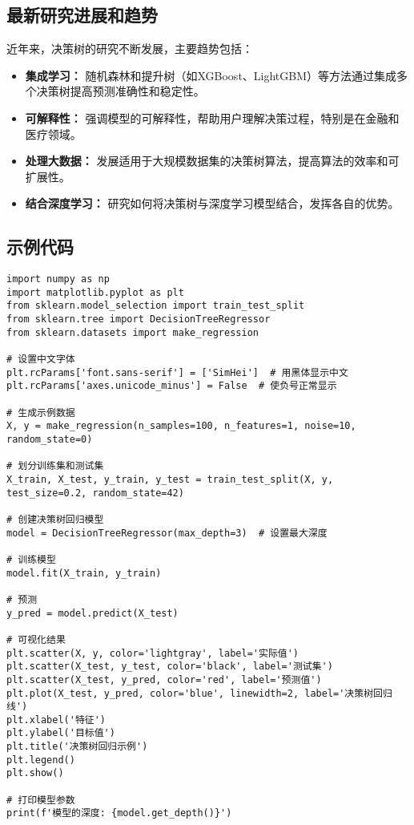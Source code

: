 \subsection*{最新研究进展和趋势}
近年来，决策树的研究不断发展，主要趋势包括：
\begin{itemize}
    \item \textbf{集成学习：} 随机森林和提升树（如XGBoost、LightGBM）等方法通过集成多个决策树提高预测准确性和稳定性。
    \item \textbf{可解释性：} 强调模型的可解释性，帮助用户理解决策过程，特别是在金融和医疗领域。
    \item \textbf{处理大数据：} 发展适用于大规模数据集的决策树算法，提高算法的效率和可扩展性。
    \item \textbf{结合深度学习：} 研究如何将决策树与深度学习模型结合，发挥各自的优势。
\end{itemize}

\subsection{示例代码}
\begin{lstlisting}
import numpy as np
import matplotlib.pyplot as plt
from sklearn.model_selection import train_test_split
from sklearn.tree import DecisionTreeRegressor
from sklearn.datasets import make_regression

# 设置中文字体
plt.rcParams['font.sans-serif'] = ['SimHei']  # 用黑体显示中文
plt.rcParams['axes.unicode_minus'] = False  # 使负号正常显示

# 生成示例数据
X, y = make_regression(n_samples=100, n_features=1, noise=10, random_state=0)

# 划分训练集和测试集
X_train, X_test, y_train, y_test = train_test_split(X, y, test_size=0.2, random_state=42)

# 创建决策树回归模型
model = DecisionTreeRegressor(max_depth=3)  # 设置最大深度

# 训练模型
model.fit(X_train, y_train)

# 预测
y_pred = model.predict(X_test)

# 可视化结果
plt.scatter(X, y, color='lightgray', label='实际值')
plt.scatter(X_test, y_test, color='black', label='测试集')
plt.scatter(X_test, y_pred, color='red', label='预测值')
plt.plot(X_test, y_pred, color='blue', linewidth=2, label='决策树回归线')
plt.xlabel('特征')
plt.ylabel('目标值')
plt.title('决策树回归示例')
plt.legend()
plt.show()

# 打印模型参数
print(f'模型的深度: {model.get_depth()}')

\end{lstlisting}


